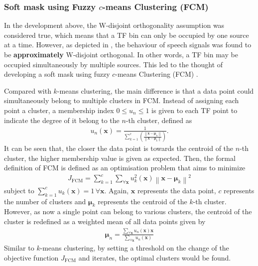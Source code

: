 \documentclass[a4paper,twoside,12pt,hidelinks]{article}
\begin{document}
\subsubsection{Soft mask using Fuzzy $c$-means Clustering (FCM)}
In the development above, the W-disjoint orthogonality assumption was considered true, which means that a TF bin can only be occupied by one source at a time. However, as depicted in , the behaviour of speech signals was found to be \textbf{approximately} W-disjoint orthogonal. In other words, a TF bin may be occupied simultaneously by multiple sources. This led to the thought of developing a soft mask using fuzzy $c$-means Clustering (FCM) \cite{Bezdek1981ObjectiveClustering}.

Compared with $k$-means clustering, the main difference is that a data point could simultaneously belong to multiple clusters in FCM. Instead of assigning each point a cluster, a membership index $0\leq u_n\leq 1$ is given to each TF point to indicate the degree of it belong to the $n$-th cluster, defined as
\begin{align}
u_{n}(\mathbf{x})=\frac{1}{\sum_{k=1}^{c}\left(\frac{\left\|\mathbf{x}-\boldsymbol{\mu}_{n}\right\|}{\left\|\mathbf{x}-\boldsymbol{\mu}_{k}\right\|}\right)}.
\end{align}
It can be seen that, the closer the data point is towards the centroid of the $n$-th cluster, the higher membership value is given as expected. Then, the formal definition of FCM is defined as an optimisation problem that aims to minimize
\begin{align}
J_\text{FCM} =\sum _{k=1}^{c}\sum_{\forall\mathbf{x}}u_k^2(\mathbf{x})\left\|\mathbf{x} -{\boldsymbol{\mu}}_{k}\right\|^{2} \label{eq:objFCM}
\end{align}
subject to $\sum_{k=1}^c u_k(\mathbf{x}) =1 \,\forall \mathbf{x}$. Again, $\mathbf{x}$ represents the data point, $c$ represents the number of clusters and $\boldsymbol{\mu}_k$ represents the centroid of the $k$-th cluster. However, as now a single point can belong to various clusters, the centroid of the cluster is redefined as a weighted mean of all data points given by 
\begin{align}
\boldsymbol{\mu}_n = \frac{\sum_{\forall \mathbf{x}} u_n(\mathbf{x})\mathbf{x}}{\sum_{\forall \mathbf{x}} u_n(\mathbf{x})} \label{eq:mufcm}
\end{align}
Similar to $k$-means clustering, by setting a threshold on the change of the objective function $J_\text{FCM}$ and iterates, the optimal clusters would be found.
\end{document}
